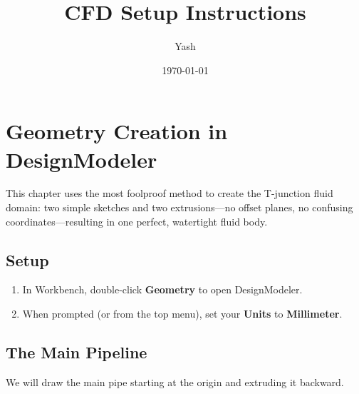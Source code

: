 \documentclass[12pt,a4paper]{report}
\title{\textbf{CFD Setup Instructions}}
\author{Yash}
\date{\today}
\begin{document}
\maketitle
\thispagestyle{empty}

\tableofcontents
\newpage


\chapter{Geometry Creation in DesignModeler}

This chapter uses the most foolproof method to create the T-junction fluid domain: two simple sketches and two extrusions---no offset planes, no confusing coordinates---resulting in one perfect, watertight fluid body.


\section{Setup}

\begin{enumerate}
  \item In Workbench, double-click \textbf{Geometry} to open DesignModeler.
  \item When prompted (or from the top menu), set your \textbf{Units} to \textbf{Millimeter}.
\end{enumerate}


\section{The Main Pipeline}

We will draw the main pipe starting at the origin and extruding it backward.
\end{document}
